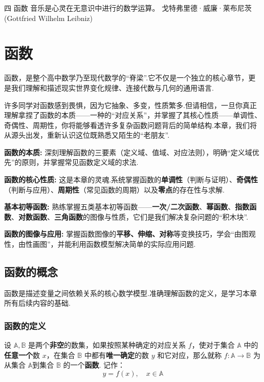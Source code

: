 \makechapteropener
{四} 
{函数} 
{音乐是心灵在无意识中进行的数学运算。}
{戈特弗里德·威廉·莱布尼茨 (Gottfried Wilhelm Leibniz)} 

\chapter{函数}

\lettrine{函}{数}，是整个高中数学乃至现代数学的“脊梁”.它不仅是一个独立的核心章节，更是我们理解和描述现实世界变化规律、连接代数与几何的通用语言.

许多同学对函数感到畏惧，因为它抽象、多变，性质繁多.但请相信，一旦你真正理解拿捏了函数的本质——一种的“对应关系”，并掌握了其核心性质——单调性、奇偶性、周期性，你将能够看透许多复杂函数问题背后的简单结构.本章，我们将从源头出发，重新认识这位既熟悉又陌生的“老朋友”.

\begin{introduction}[知识概括]
	\item \textbf{函数的本质:} 深刻理解函数的三要素（定义域、值域、对应法则），明确“定义域优先”的原则，并掌握常见函数定义域的求法.
	\item \textbf{函数的核心性质:} 这是本章的灵魂.系统掌握函数的\textbf{单调性}（判断与证明）、\textbf{奇偶性}（判断与应用）、\textbf{周期性}（常见函数的周期）以及\textbf{零点}的存在性与求解.
	\item \textbf{基本初等函数:} 熟练掌握五类基本初等函数——\textbf{一次/二次函数}、\textbf{幂函数}、\textbf{指数函数}、\textbf{对数函数}、\textbf{三角函数}的图像与性质，它们是我们解决复杂问题的“积木块”.
	\item \textbf{函数的图像与应用:} 掌握函数图像的\textbf{平移、伸缩、对称}等变换技巧，学会“由图观性，由性画图”，并能利用函数模型解决简单的实际应用问题.
\end{introduction}

\section{函数的概念}

函数是描述变量之间依赖关系的核心数学模型.准确理解函数的定义，是学习本章所有后续内容的基础.

\subsection{函数的定义}

\begin{definition}[函数]
	设 $\mathbb{A}, \mathbb{B}$ 是两个\textbf{非空}的数集，如果按照某种确定的对应关系 $f$，使对于集合 $\mathbb{A}$ 中的\textbf{任意一个}数 $x$，在集合 $\mathbb{B}$ 中都有\textbf{唯一确定}的数 $y$ 和它对应，那么就称 $f: \mathbb{A} \to \mathbb{B}$ 为从集合 $\mathbb{A}$到集合 $\mathbb{B}$ 的一个\textbf{函数}.
	记作：
	\begin{equation}
		y = f(x), \quad x \in \mathbb{A}
	\end{equation}
\end{definition}

